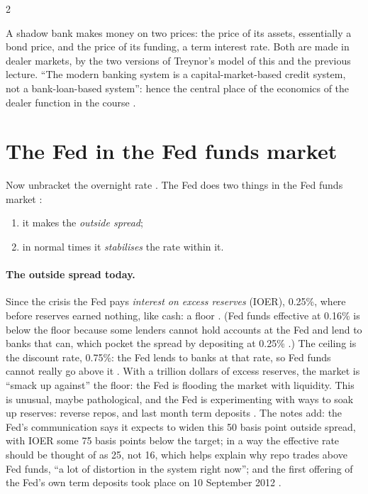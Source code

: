 \begin{paracol}{2}
\begin{intuition}
A shadow bank makes money on two prices: the price of its assets, essentially a bond price, and the price of its funding, a term interest rate. Both are made in dealer markets, by
the two versions of Treynor's model of this and the previous lecture. ``The modern banking system is a capital-market-based credit system, not a bank-loan-based system'': hence
the central place of the economics of the dealer function in the course .
\end{intuition}

\section{The Fed in the Fed funds market}\label{sec:bl-fed}

Now unbracket the overnight rate . The Fed does two things in the Fed funds market :
\begin{enumerate}
  \item it makes the \emph{outside spread};
  \item in normal times it \emph{stabilises} the rate within it.
\end{enumerate}

\paragraph{The outside spread today.} Since the crisis the Fed pays \emph{interest on excess reserves} (IOER), 0.25\%, where before reserves earned nothing, like cash: a floor
. (Fed funds effective at 0.16\% is below the floor because some lenders cannot hold accounts at the Fed and lend to banks that can, which
pocket the spread by depositing at 0.25\% .) The ceiling is the discount rate, 0.75\%: the Fed lends to banks at that rate, so Fed funds cannot
really go above it . With a trillion dollars of excess reserves, the market is ``smack up against'' the floor: the Fed is flooding the market with liquidity.
This is unusual, maybe pathological, and the Fed is experimenting with ways to soak up reserves: reverse repos, and last month term deposits .
The notes add: the Fed's communication says it expects to widen this 50 basis point outside spread, with IOER some 75 basis points below the target; in a way the effective rate
should be thought of as 25, not 16, which helps explain why repo trades above Fed funds, ``a lot of distortion in the system right now''; and the first offering of the Fed's own
term deposits took place on 10 September 2012 .


\end{paracol}
